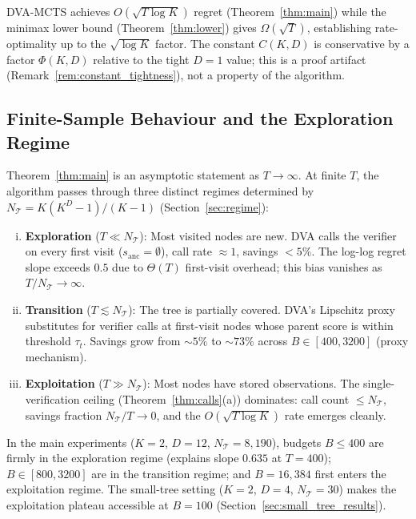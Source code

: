 \begin{corollary}
\label{cor:optimal}
DVA-MCTS achieves $O(\sqrt{T \log K})$ regret (Theorem~\ref{thm:main}) while the
minimax lower bound (Theorem~\ref{thm:lower}) gives $\Omega(\sqrt{T})$, establishing
rate-optimality up to the $\sqrt{\log K}$ factor.
The constant $C(K,D)$ is conservative by a factor $\Phi(K,D)$ relative to the tight
$D{=}1$ value; this is a proof artifact (Remark~\ref{rem:constant_tightness}),
not a property of the algorithm.
\end{corollary}

\subsection{Finite-Sample Behaviour and the Exploration Regime}

\begin{remark}
\label{rem:exploration}
Theorem~\ref{thm:main} is an asymptotic statement as $T \to \infty$.
At finite $T$, the algorithm passes through three distinct regimes determined by
$N_{\mathcal{T}} = K(K^D-1)/(K-1)$ (Section~\ref{sec:regime}):

\begin{enumerate}[(i)]
  \item \textbf{Exploration} ($T \ll N_{\mathcal{T}}$): Most visited nodes are new.
    DVA calls the verifier on every first visit ($s_{\text{anc}} = \emptyset$),
    call rate $\approx 1$, savings ${<}5\%$.  The log-log regret slope exceeds $0.5$
    due to $\Theta(T)$ first-visit overhead; this bias vanishes as
    $T/N_{\mathcal{T}} \to \infty$.

  \item \textbf{Transition} ($T \lesssim N_{\mathcal{T}}$): The tree is partially
    covered.  DVA's Lipschitz proxy substitutes for verifier calls at first-visit
    nodes whose parent score is within threshold $\tau_t$.  Savings grow from
    ${\sim}5\%$ to ${\sim}73\%$ across $B \in [400, 3200]$ (proxy mechanism).

  \item \textbf{Exploitation} ($T \gg N_{\mathcal{T}}$): Most nodes have stored
    observations.  The single-verification ceiling
    (Theorem~\ref{thm:calls}(a)) dominates: call count $\leq N_{\mathcal{T}}$,
    savings fraction $N_{\mathcal{T}}/T \to 0$, and the $O(\sqrt{T\log K})$
    rate emerges cleanly.
\end{enumerate}

In the main experiments ($K{=}2$, $D{=}12$, $N_{\mathcal{T}}{=}8{,}190$),
budgets $B \leq 400$ are firmly in the exploration regime (explains slope $0.635$
at $T{=}400$); $B \in [800, 3200]$ are in the transition regime; and $B{=}16{,}384$
first enters the exploitation regime.  The small-tree setting ($K{=}2$, $D{=}4$,
$N_{\mathcal{T}}{=}30$) makes the exploitation plateau accessible at $B{=}100$
(Section~\ref{sec:small_tree_results}).
\end{remark}

